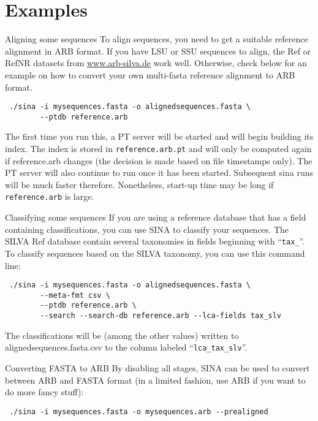\documentclass[english,a4paper]{article}
\renewcommand{\URL}[1]{\url{#1}}
\begin{document}
\section{Examples}
\begin{Description}
\item[Aligning some sequences]
To align sequences, you need to get a suitable reference alignment in ARB 
format. If you have LSU or SSU sequences to align, the Ref or RefNR 
datasets from \URL{www.arb-silva.de} work well. Otherwise, check
below for an example on how to convert your own multi-fasta reference
alignment to ARB format. 

\begin{verbatim}
 ./sina -i mysequences.fasta -o alignedsequences.fasta \
        --ptdb reference.arb
\end{verbatim}

The first time you run this, a PT server will be started and will 
begin building its index. The index is stored in 
\texttt{reference.arb.pt} and will only be computed again if 
reference.arb changes (the decision is made based on file timestamps
only). The PT server will also continue to run once it has
been started. Subsequent sina runs will be much faster therefore.
Nonetheless, start-up time may be long if \texttt{reference.arb}
is large. 

\item[Classifying some sequences]
If you are using a reference database that has a field containing 
classifications, you can use SINA to classify your sequences. The
SILVA Ref database contain several taxonomies in fields beginning 
with ``\texttt{tax\_}''. To classify sequences based on 
the SILVA taxonomy, you can use this command line:

\begin{verbatim}
 ./sina -i mysequences.fasta -o alignedsequences.fasta \
        --meta-fmt csv \
        --ptdb reference.arb \
        --search --search-db reference.arb --lca-fields tax_slv
\end{verbatim}

The classifications will be (among the other values) written to 
alignedsequences.fasta.csv to the column labeled 
``\texttt{lca\_tax\_slv}''. 
\item[Converting FASTA to ARB]
By disabling all stages, SINA can be used to convert between ARB and 
FASTA format (in a limited fashion, use ARB if you want to do more
fancy stuff):

\begin{verbatim}
 ./sina -i mysequences.fasta -o mysequences.arb --prealigned
\end{verbatim}


\end{Description}
\end{document}
